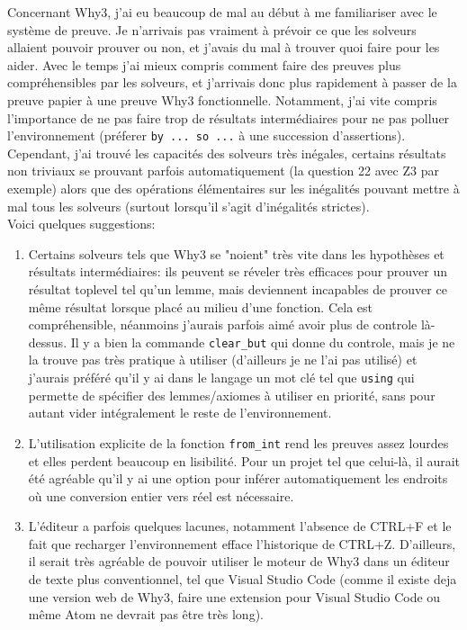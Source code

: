 \documentclass[a4paper]{article}%
\begin{document}
	Concernant Why3, j'ai eu beaucoup de mal au début à me familiariser avec le système de preuve.
	Je n'arrivais pas vraiment à prévoir ce que les solveurs allaient pouvoir prouver ou non,
	et j'avais du mal à trouver quoi faire pour les aider. Avec le temps j'ai mieux compris comment faire des preuves plus compréhensibles
	par les solveurs, et j'arrivais donc plus rapidement à passer de la preuve papier à une preuve Why3 fonctionnelle.
	Notamment, j'ai vite compris l'importance de ne pas faire trop de résultats intermédiaires pour ne pas polluer l'environnement
	(préferer \texttt{by ... so ...} à une succession d'assertions).
	Cependant, j'ai trouvé les capacités des solveurs très inégales, certains résultats non triviaux
	se prouvant parfois automatiquement (la question 22 avec Z3 par exemple) alors que des opérations élémentaires
	sur les inégalités pouvant mettre à mal tous les solveurs (surtout lorsqu'il s'agit d'inégalités strictes).\\

	Voici quelques suggestions:\\
	\begin{enumerate}
		\item Certains solveurs tels que Why3 se "noient" très vite dans les hypothèses et résultats intermédiaires:
		ils peuvent se réveler très efficaces pour prouver un résultat toplevel tel qu'un lemme,
		mais deviennent incapables de prouver ce même résultat lorsque placé au milieu d'une fonction.
		Cela est compréhensible, néanmoins j'aurais parfois aimé avoir plus de controle là-dessus.
		Il y a bien la commande \texttt{clear_but} qui donne du controle, mais je ne la trouve pas très pratique à utiliser
		(d'ailleurs je ne l'ai pas utilisé) et j'aurais préféré qu'il y ai dans le langage un mot clé tel que \texttt{using}
		qui permette de spécifier des lemmes/axiomes à utiliser en priorité, sans pour autant vider intégralement le reste de l'environnement.\\
		\item L'utilisation explicite de la fonction \texttt{from_int} rend les preuves assez lourdes et elles perdent beaucoup en lisibilité.
		Pour un projet tel que celui-là, il aurait été agréable qu'il y ai une option pour inférer automatiquement les endroits où une conversion
		entier vers réel est nécessaire.\\
		\item L'éditeur a parfois quelques lacunes, notamment l'absence de CTRL+F et le fait que recharger l'environnement efface l'historique
		de CTRL+Z. D'ailleurs, il serait très agréable de pouvoir utiliser le moteur de Why3 dans un éditeur de texte plus conventionnel, tel
		que Visual Studio Code (comme il existe deja une version web de Why3, faire une extension pour Visual Studio Code ou même Atom 
		ne devrait pas être très long).
	\end{enumerate}
\end{document}
